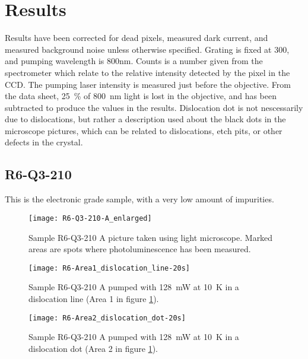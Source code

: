 \section{Results}

Results have been corrected for dead pixels, measured dark current, and measured background noise unless otherwise specified. Grating is fixed at 300, and pumping wavelength is 800nm. Counts is a number given from the spectrometer which relate to the relative intensity detected by the pixel in the CCD. The pumping laser intensity is measured just before the objective. From the data sheet, 25~\% of 800~nm light is lost in the objective, and has been subtracted to produce the values in the results. Dislocation dot is not nescessarily due to dislocations, but rather a description used about the black dots in the microscope pictures, which can be related to dislocations, etch pits, or other defects in the crystal.

\subsection{R6-Q3-210}

This is the electronic grade sample, with a very low amount of impurities.

\begin{figure}[H]
\centering
\texttt{[image: R6-Q3-210-A\_enlarged]}
\caption[R6-Q3-210 A from light microscope]{Sample R6-Q3-210 A picture taken using light microscope. Marked areas are spots where photoluminescence has been measured.}
\label{fig:R6-Q3-210-A_enlarged}%
\end{figure}


\begin{figure}[H]
\centering
\texttt{[image: R6-Area1\_dislocation\_line-20s]}
\caption[R6-Q3-210 at a dislocation line]{Sample R6-Q3-210 A pumped with 128~mW at 10~K in a dislocation line (Area 1 in figure \ref{fig:R6-Q3-210-A_enlarged}).}
\label{fig:R6-Area1_dislocation_line-20s}%
\end{figure}


\begin{figure}[H]
\centering
\texttt{[image: R6-Area2\_dislocation\_dot-20s]}
\caption[R6-Q3-210 at a dislocation dot]{Sample R6-Q3-210 A pumped with 128~mW at 10~K in a dislocation dot (Area 2 in figure \ref{fig:R6-Q3-210-A_enlarged}).}
\label{fig:R6-Area2_dislocation_dot-20s}%
\end{figure}


